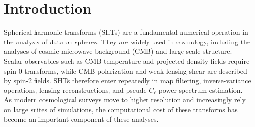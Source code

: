 \documentclass[letters,usenatbib,useAMS]{mnras}
\begin{document}
\section{Introduction}
Spherical harmonic transforms (SHTs) are a fundamental numerical operation in the analysis of data on spheres. They are widely used in cosmology, including the analyses of cosmic microwave background (CMB) and large-scale structure. Scalar observables such as CMB temperature and projected density fields require spin-0 transforms, while CMB polarization and weak lensing shear are described by spin-2 fields. SHTs therefore enter repeatedly in map filtering, inverse-variance operations, lensing reconstructions, and pseudo-$C_\ell$ power-spectrum estimation. As modern cosmological surveys move to higher resolution and increasingly rely on large suites of simulations, the computational cost of these transforms has become an important component of these analyses.


\end{document}

